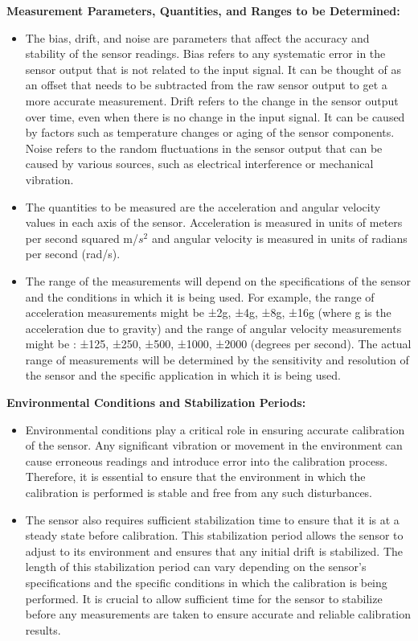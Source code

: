 \textbf{Measurement Parameters, Quantities, and Ranges to be Determined:}
\begin{itemize}
\item The bias, drift, and noise are parameters that affect the accuracy and stability of the sensor readings. Bias refers to any systematic error in the sensor output that is not related to the input signal. It can be thought of as an offset that needs to be subtracted from the raw sensor output to get a more accurate measurement. Drift refers to the change in the sensor output over time, even when there is no change in the input signal. It can be caused by factors such as temperature changes or aging of the sensor components. Noise refers to the random fluctuations in the sensor output that can be caused by various sources, such as electrical interference or mechanical vibration.
\item The quantities to be measured are the acceleration and angular velocity values in each axis of the sensor. Acceleration is measured in units of meters per second squared m/\(s^2\) and angular velocity is measured in units of radians per second (rad/s).
\item The range of the measurements will depend on the specifications of the sensor and the conditions in which it is being used. For example, the range of acceleration measurements might be ±2g, ±4g, ±8g, ±16g  (where g is the acceleration due to gravity) and the range of angular velocity measurements might be : ±125, ±250, ±500, ±1000, ±2000 (degrees per second). The actual range of measurements will be determined by the sensitivity and resolution of the sensor and the specific application in which it is being used.
\end{itemize}

\textbf{Environmental Conditions and Stabilization Periods:}
\begin{itemize}
    \item Environmental conditions play a critical role in ensuring accurate calibration of the sensor. Any significant vibration or movement in the environment can cause erroneous readings and introduce error into the calibration process. Therefore, it is essential to ensure that the environment in which the calibration is performed is stable and free from any such disturbances.
    \item The sensor also requires sufficient stabilization time to ensure that it is at a steady state before calibration. This stabilization period allows the sensor to adjust to its environment and ensures that any initial drift is stabilized. The length of this stabilization period can vary depending on the sensor's specifications and the specific conditions in which the calibration is being performed. It is crucial to allow sufficient time for the sensor to stabilize before any measurements are taken to ensure accurate and reliable calibration results.
\end{itemize}

